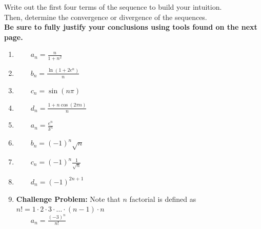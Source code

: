\vspace*{.1in}
Write out the first four terms of the sequence to build your intuition.\\ %
Then, determine the convergence or divergence of the sequences.\\ %
\textbf{Be sure to fully justify your conclusions using tools found on the next page.}
\vfill
\setlength{\columnseprule}{0pt}
\begin{enumerate}


\item \(\qquad a_n = \frac{n}{1+n^2}\) \vspace*{.25in}

\item \(\qquad b_n = \frac{\ln(1+2e^n)}{n}\) \vspace*{.25in}

\item \(\qquad c_n = \sin(n\pi)\)\vspace*{.25in}

\item \(\qquad d_n = \frac{1+n\cos(2\pi n)}{n}\)\vspace*{.25in}

\item \(\qquad a_n = \frac{e^n}{3^n}\)\vspace*{.25in}

\item \(\qquad b_n =(-1)^n \sqrt{n}\) \vspace*{.25in}

\item \(\qquad c_n =(-1)^n \frac{1}{\sqrt{n}}\) \vspace*{.25in}

\item \(\qquad d_n =(-1)^{2n+1} \) \vspace*{.25in}

\vfill

\item \textbf{Challenge Problem:} Note that \(n\) factorial is defined as \(n! = 1\cdot 2 \cdot 3 \cdot \ldots \cdot (n-1) \cdot n \)\\
 \(\qquad a_n =\frac{(-3)^n}{n!} \) 

\vfill
\end{enumerate}

